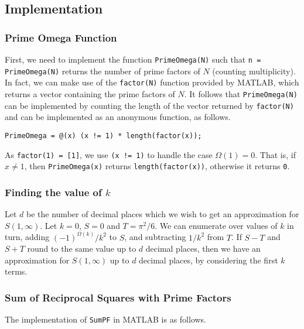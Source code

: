 
\subsection{Implementation}
\subsubsection{Prime Omega Function}
First, we need to implement the function \lstinline|PrimeOmega(N)| such that \lstinline|n = PrimeOmega(N)| returns the number of prime factors of $N$ (counting multiplicity). In fact, we can make use of the \lstinline|factor(N)| function provided by MATLAB, which returns a vector containing the prime factors of $N$. It follows that \lstinline|PrimeOmega(N)| can be implemented by counting the length of the vector returned by \lstinline|factor(N)| and can be implemented as an anonymous function, as follows.

\begin{lstlisting}
PrimeOmega = @(x) (x != 1) * length(factor(x));
\end{lstlisting}

\noindent
As \lstinline|factor(1) = [1]|, we use \lstinline|(x != 1)| to handle the case $\Omega(1) = 0$. That is, if $x \neq 1$, then \lstinline|PrimeOmega(x)| returns \lstinline|length(factor(x))|, otherwise it returns \lstinline|0|.

\subsubsection{Finding the value of $k$}
Let $d$ be the number of decimal places which we wish to get an approximation for $S(1, \infty)$. Let $k = 0$, $S = 0$ and $T = \pi^2 / 6$. We can enumerate over values of $k$ in turn, adding $(-1)^{\Omega(k)} / k^2$ to $S$, and subtracting $1 / k^2$ from $T$. If $S - T$ and $S + T$ round to the same value up to $d$ decimal places, then we have an approximation for $S(1, \infty)$ up to $d$ decimal places, by considering the first $k$ terms.

\newpage
\subsubsection{Sum of Reciprocal Squares with Prime Factors}
The implementation of \lstinline|SumPF| in MATLAB is as follows.

